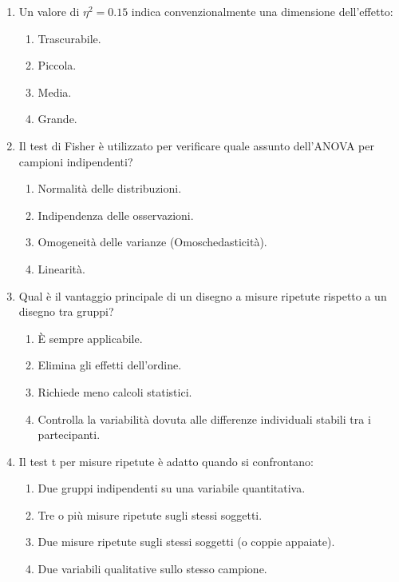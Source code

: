 \documentclass[12pt, a4paper]{article}
\newcommand{\etasq}{\eta^2} %
\begin{document}
\begin{enumerate}
    \item Un valore di $\etasq = 0.15$ indica convenzionalmente una dimensione dell'effetto:
    \begin{enumerate}
        \item Trascurabile.
        \item Piccola.
        \item Media.
        \item Grande.
    \end{enumerate}

    \item Il test di Fisher è utilizzato per verificare quale assunto dell'ANOVA per campioni indipendenti?
    \begin{enumerate}
        \item Normalità delle distribuzioni.
        \item Indipendenza delle osservazioni.
        \item Omogeneità delle varianze (Omoschedasticità).
        \item Linearità.
    \end{enumerate}

    \item Qual è il vantaggio principale di un disegno a misure ripetute rispetto a un disegno tra gruppi?
    \begin{enumerate}
        \item È sempre applicabile.
        \item Elimina gli effetti dell'ordine.
        \item Richiede meno calcoli statistici.
        \item Controlla la variabilità dovuta alle differenze individuali stabili tra i partecipanti.
    \end{enumerate}

     \item Il test t per misure ripetute è adatto quando si confrontano:
    \begin{enumerate}
        \item Due gruppi indipendenti su una variabile quantitativa.
        \item Tre o più misure ripetute sugli stessi soggetti.
        \item Due misure ripetute sugli stessi soggetti (o coppie appaiate).
        \item Due variabili qualitative sullo stesso campione.
    \end{enumerate}


\end{enumerate}
\end{document}
